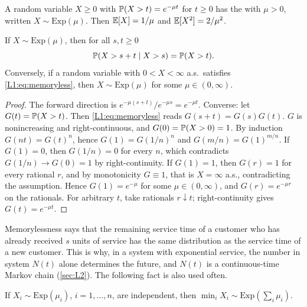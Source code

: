\begin{definition}\label{L1:def:exp}
A random variable $X\ge0$ with $\mathbb{P}(X>t)=e^{-\mu t}$ for $t\ge0$ has the
 with  $\mu>0$, written
$X\sim\mathrm{Exp}(\mu)$. Then $\mathbb{E}[X]=1/\mu$ and $\mathbb{E}[X^2]=2/\mu^2$.
\end{definition}

\begin{proposition}\label{prop:memoryless}
If $X\sim\mathrm{Exp}(\mu)$, then for all $s,t\ge0$
\begin{equation}\label{L1:eq:memoryless}
  \mathbb{P}(X>s+t\mid X>s)=\mathbb{P}(X>t).
\end{equation}
Conversely, if a random variable with $0<X<\infty$ a.s.\ satisfies
\eqref{L1:eq:memoryless}, then $X\sim\mathrm{Exp}(\mu)$ for some $\mu\in(0,\infty)$.
\end{proposition}

\begin{proof}
The forward direction is $e^{-\mu(s+t)}/e^{-\mu s}=e^{-\mu t}$.
Converse: let $G(t)=\mathbb{P}(X>t)$. Then \eqref{L1:eq:memoryless} reads
$G(s+t)=G(s)G(t)$. $G$ is nonincreasing and right-continuous, and
$G(0)=\mathbb{P}(X>0)=1$. By induction $G(nt)=G(t)^n$, hence $G(1)=G(1/n)^n$ and
$G(m/n)=G(1)^{m/n}$.
If $G(1)=0$, then $G(1/n)=0$ for every $n$, which contradicts
$G(1/n)\to G(0)=1$ by right-continuity. If $G(1)=1$, then $G(r)=1$ for every
rational $r$, and by monotonicity $G\equiv1$, that is $X=\infty$ a.s., contradicting
the assumption. Hence $G(1)=e^{-\mu}$ for some $\mu\in(0,\infty)$, and
$G(r)=e^{-\mu r}$ on the rationals. For arbitrary $t$, take rationals $r\downarrow t$;
right-continuity gives $G(t)=e^{-\mu t}$.
\end{proof}

Memorylessness says that the remaining service time of a customer who has already
received $s$ units of service has the same distribution as the service time of a new
customer. This is why, in a system with exponential service, the number in system
$N(t)$ alone determines the future, and $N(t)$ is a continuous-time Markov chain
(\cref{sec:L2}). The following fact is also used often.

\begin{lemma}\label{L1:lem:min}
If $X_i\sim\mathrm{Exp}(\mu_i)$, $i=1,\dots,n$, are independent, then
$\min_iX_i\sim\mathrm{Exp}(\sum_i\mu_i)$.
\end{lemma}

